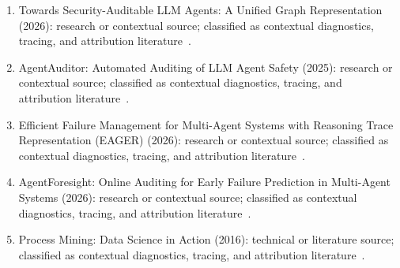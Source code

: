 \begin{enumerate}
\item Towards Security-Auditable {LLM} Agents: A Unified Graph Representation (2026): research or contextual source; classified as contextual diagnostics, tracing, and attribution literature~\cite{ext016}.
\item {AgentAuditor}: Automated Auditing of {LLM} Agent Safety (2025): research or contextual source; classified as contextual diagnostics, tracing, and attribution literature~\cite{ext021}.
\item Efficient Failure Management for Multi-Agent Systems with Reasoning Trace Representation ({EAGER}) (2026): research or contextual source; classified as contextual diagnostics, tracing, and attribution literature~\cite{ext037}.
\item {AgentForesight}: Online Auditing for Early Failure Prediction in Multi-Agent Systems (2026): research or contextual source; classified as contextual diagnostics, tracing, and attribution literature~\cite{ext053}.
\item Process Mining: Data Science in Action (2016): technical or literature source; classified as contextual diagnostics, tracing, and attribution literature~\cite{ext141}.
\end{enumerate}
\normalsize

